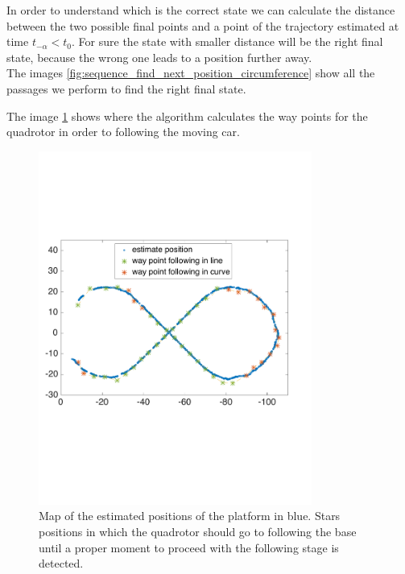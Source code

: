 \begin{itemize}
In order to understand which is the correct state we can calculate the distance between the two possible final points and a point of the trajectory estimated at time $ t_{-\alpha} < t_0$. For sure the state with smaller distance will be the right final state, because the wrong one leads to a position further away.\\
The images  \ref{fig:sequence_find_next_position_circumference} show all the passages we perform to find the right final state.

The image \ref{fig:map_waypoints} shows where the algorithm calculates the way points for the quadrotor in order to following the moving car.

\begin{figure}[!htbp]
    \centering
    \includegraphics[width=0.8\textwidth]{img/following_platform_long_map_waypoints.pdf}
    \caption{Map of the estimated positions of the platform in blue.  Stars positions in which the quadrotor should go to following the base until a proper moment to proceed with the following stage is detected. }
    \label{fig:map_waypoints}
\end{figure}


\end{itemize}
